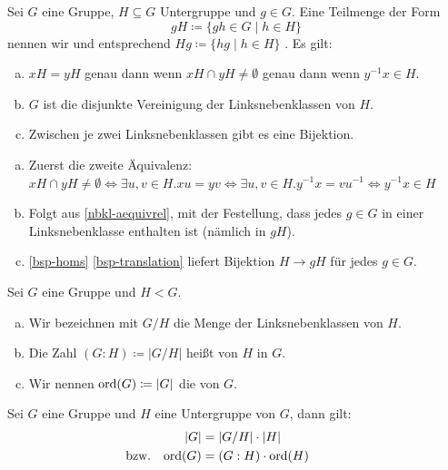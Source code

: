 \begin{lemma}
  \label{lemma-zu-nebenklassen}
  Sei \(G\) eine Gruppe, \(H\subseteq G\) Untergruppe und \(g\in G\).
  Eine Teilmenge der Form
  \[gH\coloneq \{gh\in G\mid h\in H\}\]
  nennen wir  und entsprechend \(Hg\coloneq\{hg\mid h\in H\}\) . Es gilt:
  \begin{enumerate}[(a)]
  \item\label{nbkl-aequivrel} \(xH=yH\) genau dann wenn \(xH\cap yH\neq \emptyset\) genau dann wenn  \(y^{-1}x\in H\). 
  \item \(G\) ist die disjunkte Vereinigung der Linksnebenklassen von \(H\).
  \item Zwischen je zwei Linksnebenklassen gibt es eine Bijektion.
  \end{enumerate}
\end{lemma}

\begin{beweis}
  \begin{enumerate}[(a)]
  \item Zuerst die zweite Äquivalenz: \(xH\cap yH\neq\emptyset \Leftrightarrow
    \exists u,v\in H. xu=yv
    \Leftrightarrow \exists u,v\in H. y^{-1}x=vu^{-1}
    \Leftrightarrow y^{-1}x\in H\)
  \item Folgt aus \cref{nbkl-aequivrel}, mit der Festellung, dass jedes \(g\in G\) in einer Linksnebenklasse enthalten ist (nämlich in \(gH\)).
  \item \ref{bsp-homs} \ref{bsp-translation} liefert Bijektion \(H\to gH\) für jedes \(g\in G\).
  \end{enumerate}
\end{beweis}

\begin{definition}
  Sei \(G\) eine Gruppe und \(H<G\).
  \begin{enumerate}[(a)]
  \item Wir bezeichnen mit \(G/H\) die Menge der Linksnebenklassen von \(H\).
  \item Die Zahl \((G : H)\coloneq |G/H|\) heißt  von \(H\) in \(G\).
  \item Wir nennen \(\mathrm{ord}(G)\coloneq |G|\)\index{\(\ord\)} die  von \(G\).
  \end{enumerate}
\end{definition}

\begin{satz}
  \label{lagrange}
  Sei \(G\) eine Gruppe und \(H\) eine Untergruppe von \(G\), dann gilt:
  \begin{align*}
    |G|&=|G/H |\cdot |H| \\
    \llap{\text{bzw.\quad }}\ord(G)&=(G : H)\cdot \ord(H)
  \end{align*}
\end{satz}

